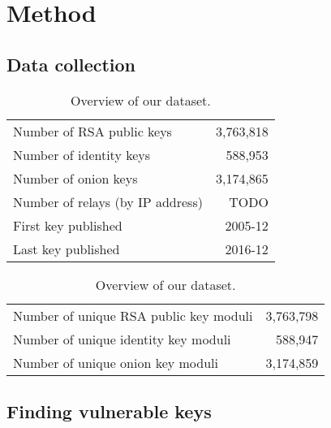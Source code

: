 \section{Method}

\subsection{Data collection}

\begin{table}[t]
	\centering
	\begin{tabular}{l r}
	\toprule
	Number of RSA public keys & 3,763,818 \\
	Number of identity keys & 588,953 \\
	Number of onion keys & 3,174,865 \\
	\midrule
	Number of relays (by IP address) & TODO \\
	First key published & 2005-12 \\
	Last key published & 2016-12 \\
	\bottomrule
	\end{tabular}
	\caption{Overview of our dataset.}
	\label{tab:dataset}
\end{table}

\begin{table}[t]
	\centering
	\begin{tabular}{l r}
	\toprule
	Number of unique RSA public key moduli & 3,763,798 \\
	Number of unique identity key moduli & 588,947 \\
	Number of unique onion key moduli & 3,174,859 \\
	\bottomrule
	\end{tabular}
	\caption{Overview of our dataset.}
	\label{tab:dataset}
\end{table}

\subsection{Finding vulnerable keys}
